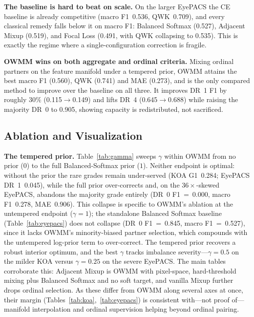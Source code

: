 \documentclass[runningheads]{svproc}
\begin{document}
\textbf{The baseline is hard to beat on scale.} On the larger EyePACS the CE baseline is already competitive (macro F1~0.536, QWK~0.709), and every classical remedy falls below it on macro F1: Balanced Softmax (0.527), Adjacent Mixup (0.519), and Focal Loss (0.491, with QWK collapsing to 0.535). This is exactly the regime where a single-configuration correction is fragile.

\textbf{OWMM wins on both aggregate and ordinal criteria.} Mixing ordinal partners on the feature manifold under a tempered prior, OWMM attains the best macro F1 (0.560), QWK (0.741) and MAE (0.273), and is the only compared method to improve over the baseline on all three. It improves DR~1 F1 by roughly $30\%$ (0.115$\to$0.149) and lifts DR~4 (0.645$\to$0.688) while raising the majority DR~0 to 0.905, showing capacity is redistributed, not sacrificed.

\subsection{Ablation and Visualization}

\textbf{The tempered prior.} Table~\ref{tab:gamma} sweeps $\gamma$ within OWMM from no prior ($0$) to the full Balanced-Softmax prior ($1$). Neither endpoint is optimal: without the prior the rare grades remain under-served (KOA G1~0.284; EyePACS DR~1~0.045), while the full prior over-corrects and, on the $36\times$-skewed EyePACS, abandons the majority grade entirely (DR~0 F1~=~0.000, macro F1~0.278, MAE~0.906). This collapse is specific to OWMM's ablation at the untempered endpoint ($\gamma{=}1$); the standalone Balanced Softmax baseline (Table~\ref{tab:eyepacs}) does not collapse (DR~0 F1~=~0.845, macro F1~=~0.527), since it lacks OWMM's minority-biased partner selection, which compounds with the untempered log-prior term to over-correct. The tempered prior recovers a robust interior optimum, and the best $\gamma$ tracks imbalance severity---$\gamma=0.5$ on the milder KOA versus $\gamma=0.25$ on the severe EyePACS. The main tables corroborate this: Adjacent Mixup is OWMM with pixel-space, hard-threshold mixing plus Balanced Softmax and no soft target, and vanilla Mixup further drops ordinal selection. As these differ from OWMM along several axes at once, their margin (Tables~\ref{tab:koa},~\ref{tab:eyepacs}) is consistent with---not proof of---manifold interpolation and ordinal supervision helping beyond ordinal pairing.
\end{document}
